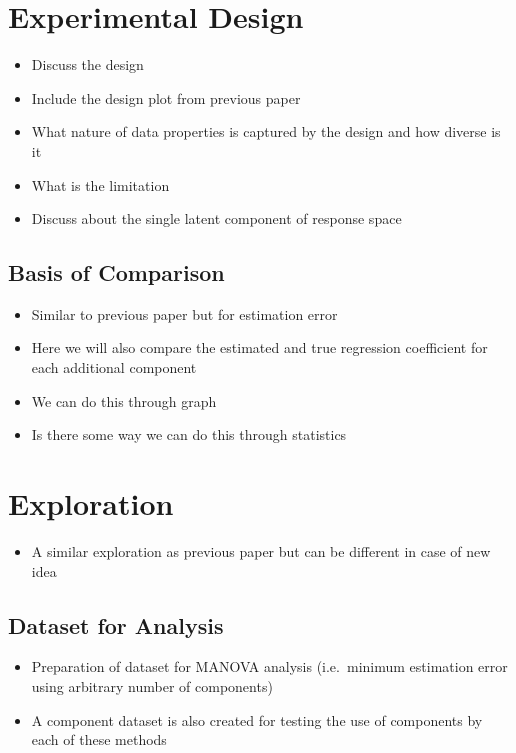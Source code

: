 \documentclass[12pt,3p,authoryear]{elsarticle}
\providecommand{\tightlist}{%
  \setlength{\itemsep}{0pt}\setlength{\parskip}{0pt}}
\begin{document}
\hypertarget{experimental-design}{\section{Experimental
Design}\label{experimental-design}}

\begin{itemize}
\tightlist
\item
  Discuss the design
\item
  Include the design plot from previous paper
\item
  What nature of data properties is captured by the design and how
  diverse is it
\item
  What is the limitation
\item
  Discuss about the single latent component of response space
\end{itemize}

\subsection{Basis of Comparison}\label{basis-of-comparison}

\begin{itemize}
\tightlist
\item
  Similar to previous paper but for estimation error
\item
  Here we will also compare the estimated and true regression
  coefficient for each additional component
\item
  We can do this through graph
\item
  Is there some way we can do this through statistics
\end{itemize}

\section{Exploration}\label{exploration}

\begin{itemize}
\tightlist
\item
  A similar exploration as previous paper but can be different in case
  of new idea
\end{itemize}

\subsection{Dataset for Analysis}\label{dataset-for-analysis}

\begin{itemize}
\tightlist
\item
  Preparation of dataset for MANOVA analysis (i.e.~minimum estimation
  error using arbitrary number of components)
\item
  A component dataset is also created for testing the use of components
  by each of these methods
\end{itemize}
\end{document}
